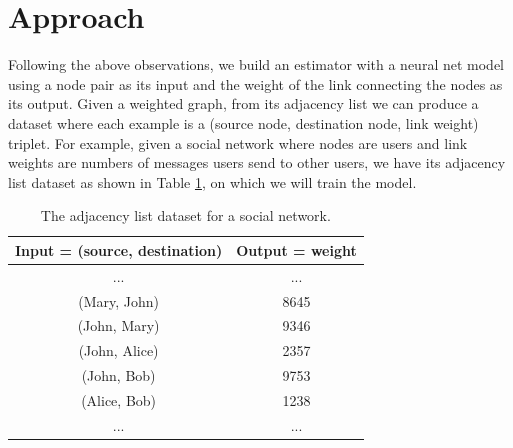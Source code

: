 \documentclass[12pt]{WSUThesis}
\theoremstyle{definition}
\begin{document}
\section{Approach}
\label{model-r}
Following the above observations,
we build an estimator with a neural net model using a node pair as its input
and the weight of the link connecting the nodes as its output.
Given a weighted graph, from its adjacency list we can produce a dataset where each example is a (source node, destination node, link weight) triplet.
For example, given a social network where nodes are users and link weights are numbers of messages users send to other users, we have its adjacency list dataset as shown in Table \ref{tab:link-list-dataset}, on which we will train the model.
\begin{table}[ht] \centering
	\caption{The adjacency list dataset for a social network.}
	\begin{tabular}{cc} \hline \rowcolor{blue!30}
		\textbf{Input = (source, destination)} & \textbf{Output = weight} \\ \hline
		...                        & ... \\ \hline
		(Mary, John) & 8645 \\ \hline
		(John, Mary) & 9346 \\ \hline
		(John, Alice) & 2357 \\ \hline
		(John, Bob) & 9753 \\ \hline
		(Alice, Bob) & 1238 \\ \hline
		...                        & ... \\ \hline
	\end{tabular}
	\label{tab:link-list-dataset}
\end{table}
\end{document}
